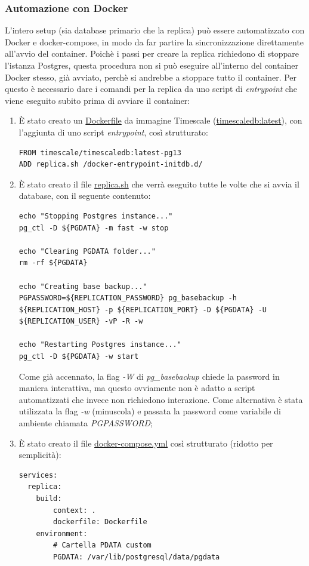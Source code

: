 \subsubsection{Automazione con Docker}
L'intero setup (sia database primario che la replica) può essere automatizzato con Docker e docker-compose, in modo da far partire la sincronizzazione direttamente all'avvio del container.
Poichè i passi per creare la replica richiedono di stoppare l'istanza Postgres, questa procedura non si può eseguire all'interno del container Docker stesso, già avviato, perchè si andrebbe a stoppare tutto il container.
Per questo è necessario dare i comandi per la replica da uno script di \textit{entrypoint} che viene eseguito subito prima di avviare il container:
\begin{enumerate}
  \item È stato creato un \url{Dockerfile} da immagine Timescale (\url{timescaledb:latest}), con l'aggiunta di uno script \textit{entrypoint}, così strutturato:
  \vspace{1mm}
  \begin{lstlisting}[]
FROM timescale/timescaledb:latest-pg13
ADD replica.sh /docker-entrypoint-initdb.d/
\end{lstlisting}
  \item È stato creato il file \url{replica.sh} che verrà eseguito tutte le volte che si avvia il database, con il seguente contenuto:
  \vspace{1mm}
  \begin{lstlisting}[]
echo "Stopping Postgres instance..." 
pg_ctl -D ${PGDATA} -m fast -w stop

echo "Clearing PGDATA folder..." 
rm -rf ${PGDATA}

echo "Creating base backup..." 
PGPASSWORD=${REPLICATION_PASSWORD} pg_basebackup -h ${REPLICATION_HOST} -p ${REPLICATION_PORT} -D ${PGDATA} -U ${REPLICATION_USER} -vP -R -w

echo "Restarting Postgres instance..." 
pg_ctl -D ${PGDATA} -w start
\end{lstlisting}
Come già accennato, la flag \textit{-W} di \textit{pg\_basebackup} chiede la password in maniera interattiva, ma questo ovviamente non è adatto a script automatizzati che invece non richiedono interazione. Come alternativa è stata utilizzata la flag \textit{-w} (minuscola) e passata la password come variabile di ambiente chiamata \textit{PGPASSWORD};
\item È stato creato il file \url{docker-compose.yml} così strutturato (ridotto per semplicità):
\vspace{1mm}
  \begin{lstlisting}[]
services:
  replica:
    build:
        context: .
        dockerfile: Dockerfile
    environment:
        # Cartella PDATA custom
        PGDATA: /var/lib/postgresql/data/pgdata


\end{lstlisting}
\end{enumerate}
